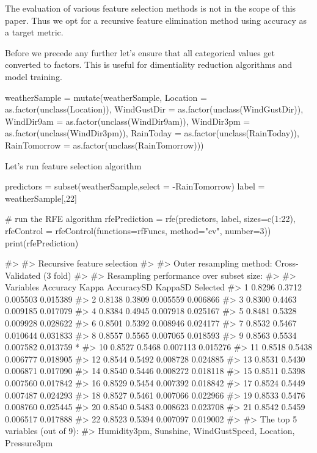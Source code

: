 The evaluation of various feature selection methods is not in the scope
of this paper. Thus we opt for a recursive feature elimination method
using accuracy as a target metric.

Before we precede any further let's ensure that all categorical values
get converted to factors. This is useful for dimentiality reduction
algorithms and model training.

\begin{Schunk}
\begin{Sinput}
weatherSample = mutate(weatherSample, Location = as.factor(unclass(Location)), 
          WindGustDir = as.factor(unclass(WindGustDir)),
          WindDir9am = as.factor(unclass(WindDir9am)), WindDir3pm = as.factor(unclass(WindDir3pm)),
          RainToday = as.factor(unclass(RainToday)), RainTomorrow = as.factor(unclass(RainTomorrow)))
\end{Sinput}
\end{Schunk}

Let's run feature selection algorithm

\begin{Schunk}
\begin{Sinput}
predictors = subset(weatherSample,select = -RainTomorrow)
label = weatherSample[,22]

# run the RFE algorithm
rfePrediction = rfe(predictors, label, sizes=c(1:22), 
                    rfeControl = rfeControl(functions=rfFuncs, method="cv", number=3))
print(rfePrediction)
\end{Sinput}
\begin{Soutput}
#> 
#> Recursive feature selection
#> 
#> Outer resampling method: Cross-Validated (3 fold) 
#> 
#> Resampling performance over subset size:
#> 
#>  Variables Accuracy  Kappa AccuracySD  KappaSD Selected
#>          1   0.8296 0.3712   0.005503 0.015389         
#>          2   0.8138 0.3809   0.005559 0.006866         
#>          3   0.8300 0.4463   0.009185 0.017079         
#>          4   0.8384 0.4945   0.007918 0.025167         
#>          5   0.8481 0.5328   0.009928 0.028622         
#>          6   0.8501 0.5392   0.008946 0.024177         
#>          7   0.8532 0.5467   0.010644 0.031833         
#>          8   0.8557 0.5565   0.007065 0.018593         
#>          9   0.8563 0.5534   0.007582 0.013759        *
#>         10   0.8527 0.5468   0.007113 0.015276         
#>         11   0.8518 0.5438   0.006777 0.018905         
#>         12   0.8544 0.5492   0.008728 0.024885         
#>         13   0.8531 0.5430   0.006871 0.017090         
#>         14   0.8540 0.5446   0.008272 0.018118         
#>         15   0.8511 0.5398   0.007560 0.017842         
#>         16   0.8529 0.5454   0.007392 0.018842         
#>         17   0.8524 0.5449   0.007487 0.024293         
#>         18   0.8527 0.5461   0.007066 0.022966         
#>         19   0.8533 0.5476   0.008760 0.025445         
#>         20   0.8540 0.5483   0.008623 0.023708         
#>         21   0.8542 0.5459   0.006517 0.017888         
#>         22   0.8523 0.5394   0.007097 0.019002         
#> 
#> The top 5 variables (out of 9):
#>    Humidity3pm, Sunshine, WindGustSpeed, Location, Pressure3pm
\end{Soutput}
\end{Schunk}

